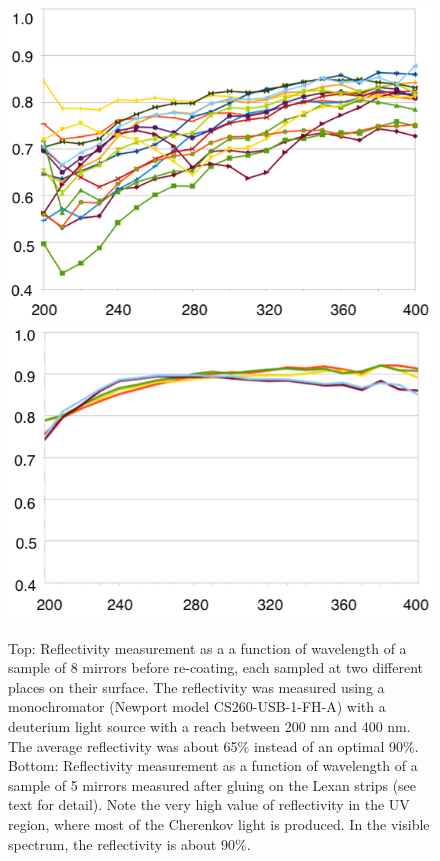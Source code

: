 \begin{figure}
\centering
	\includegraphics[width=0.99\columnwidth, height=0.7\columnwidth]{img/mirrorsReflectivityBefore.png}
	\includegraphics[width=0.99\columnwidth, height=0.7\columnwidth]{img/mirrorsReflectivityAfter.png}
	\caption{Top: Reflectivity measurement as a a function of wavelength of a sample of 8 mirrors before re-coating,
            each sampled at two different places on their surface. The reflectivity
			was measured using a monochromator (Newport model CS260-USB-1-FH-A) with a deuterium light source with a reach
            between 200 nm and 400 nm. The average reflectivity was about 65$\%$ instead of an optimal 90$\%$.
			Bottom: Reflectivity measurement as a function of wavelength of a sample of 5 mirrors measured
            after gluing on the Lexan strips (see text for detail).
            Note the very high value of reflectivity in the UV region, where most of the Cherenkov light is produced.
            In the visible spectrum, the reflectivity is about 90$\%$.}
	\label{fig:reflectivityBeforeAndAfter}
\end{figure}


